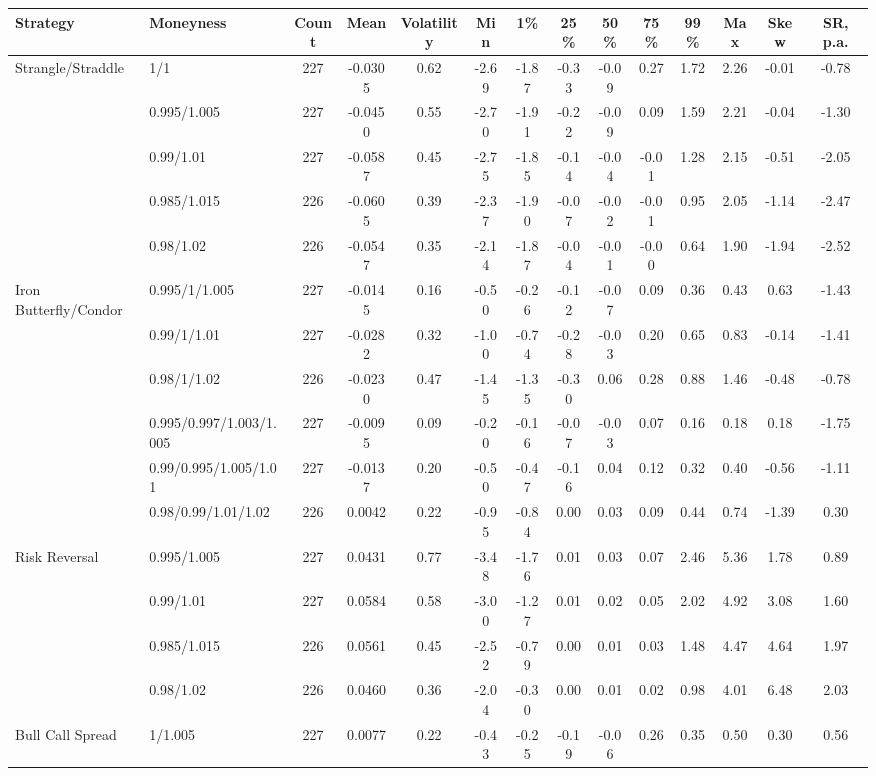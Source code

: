 \begin{tabular}{llcccccccccccc}
\toprule
Strategy & Moneyness & Count & Mean & Volatility & Min & 1\% & 25\% & 50\% & 75\% & 99\% & Max & Skew & SR, p.a. \\
\midrule
Strangle/Straddle & 1/1 & 227 & -0.0305 & 0.62 & -2.69 & -1.87 & -0.33 & -0.09 & 0.27 & 1.72 & 2.26 & -0.01 & -0.78 \\
 & 0.995/1.005 & 227 & -0.0450 & 0.55 & -2.70 & -1.91 & -0.22 & -0.09 & 0.09 & 1.59 & 2.21 & -0.04 & -1.30 \\
 & 0.99/1.01 & 227 & -0.0587 & 0.45 & -2.75 & -1.85 & -0.14 & -0.04 & -0.01 & 1.28 & 2.15 & -0.51 & -2.05 \\
 & 0.985/1.015 & 226 & -0.0605 & 0.39 & -2.37 & -1.90 & -0.07 & -0.02 & -0.01 & 0.95 & 2.05 & -1.14 & -2.47 \\
 & 0.98/1.02 & 226 & -0.0547 & 0.35 & -2.14 & -1.87 & -0.04 & -0.01 & -0.00 & 0.64 & 1.90 & -1.94 & -2.52 \\
Iron Butterfly/Condor & 0.995/1/1.005 & 227 & -0.0145 & 0.16 & -0.50 & -0.26 & -0.12 & -0.07 & 0.09 & 0.36 & 0.43 & 0.63 & -1.43 \\
 & 0.99/1/1.01 & 227 & -0.0282 & 0.32 & -1.00 & -0.74 & -0.28 & -0.03 & 0.20 & 0.65 & 0.83 & -0.14 & -1.41 \\
 & 0.98/1/1.02 & 226 & -0.0230 & 0.47 & -1.45 & -1.35 & -0.30 & 0.06 & 0.28 & 0.88 & 1.46 & -0.48 & -0.78 \\
 & 0.995/0.997/1.003/1.005 & 227 & -0.0095 & 0.09 & -0.20 & -0.16 & -0.07 & -0.03 & 0.07 & 0.16 & 0.18 & 0.18 & -1.75 \\
 & 0.99/0.995/1.005/1.01 & 227 & -0.0137 & 0.20 & -0.50 & -0.47 & -0.16 & 0.04 & 0.12 & 0.32 & 0.40 & -0.56 & -1.11 \\
 & 0.98/0.99/1.01/1.02 & 226 & 0.0042 & 0.22 & -0.95 & -0.84 & 0.00 & 0.03 & 0.09 & 0.44 & 0.74 & -1.39 & 0.30 \\
Risk Reversal & 0.995/1.005 & 227 & 0.0431 & 0.77 & -3.48 & -1.76 & 0.01 & 0.03 & 0.07 & 2.46 & 5.36 & 1.78 & 0.89 \\
 & 0.99/1.01 & 227 & 0.0584 & 0.58 & -3.00 & -1.27 & 0.01 & 0.02 & 0.05 & 2.02 & 4.92 & 3.08 & 1.60 \\
 & 0.985/1.015 & 226 & 0.0561 & 0.45 & -2.52 & -0.79 & 0.00 & 0.01 & 0.03 & 1.48 & 4.47 & 4.64 & 1.97 \\
 & 0.98/1.02 & 226 & 0.0460 & 0.36 & -2.04 & -0.30 & 0.00 & 0.01 & 0.02 & 0.98 & 4.01 & 6.48 & 2.03 \\
Bull Call Spread & 1/1.005 & 227 & 0.0077 & 0.22 & -0.43 & -0.25 & -0.19 & -0.06 & 0.26 & 0.35 & 0.50 & 0.30 & 0.56 \\

\end{tabular}
